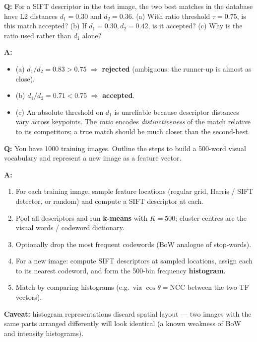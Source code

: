 \begin{exbox}
\textbf{Q:} For a SIFT descriptor in the test image, the two best matches in the database have L2 distances $d_1 = 0.30$ and $d_2 = 0.36$. (a) With ratio threshold $\tau = 0.75$, is this match accepted? (b) If $d_1 = 0.30, d_2 = 0.42$, is it accepted? (c) Why is the ratio used rather than $d_1$ alone?

\textbf{A:}
\begin{itemize}
  \item (a) $d_1/d_2 = 0.83 > 0.75$ $\Rightarrow$ \textbf{rejected} (ambiguous: the runner-up is almost as close).
  \item (b) $d_1/d_2 = 0.71 < 0.75$ $\Rightarrow$ \textbf{accepted}.
  \item (c) An absolute threshold on $d_1$ is unreliable because descriptor distances vary across keypoints. The \emph{ratio} encodes \emph{distinctiveness} of the match relative to its competitors; a true match should be much closer than the second-best.
\end{itemize}
\end{exbox}

\begin{exbox}
\textbf{Q:} You have 1000 training images. Outline the steps to build a 500-word visual vocabulary and represent a new image as a feature vector.

\textbf{A:}
\begin{enumerate}
  \item For each training image, sample feature locations (regular grid, Harris / SIFT detector, or random) and compute a SIFT descriptor at each.
  \item Pool all descriptors and run \textbf{k-means} with $K = 500$; cluster centres are the visual words / codeword dictionary.
  \item Optionally drop the most frequent codewords (BoW analogue of stop-words).
  \item For a new image: compute SIFT descriptors at sampled locations, assign each to its nearest codeword, and form the 500-bin frequency \textbf{histogram}.
  \item Match by comparing histograms (e.g.\ via $\cos\theta = \mathrm{NCC}$ between the two TF vectors).
\end{enumerate}
\textbf{Caveat:} histogram representations discard spatial layout — two images with the same parts arranged differently will look identical (a known weakness of BoW and intensity histograms).
\end{exbox}

